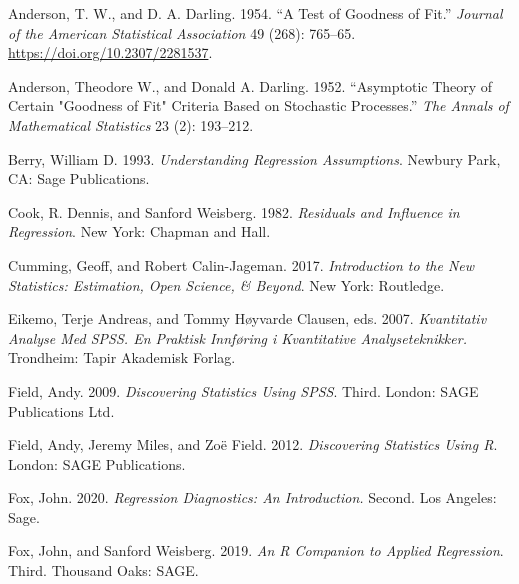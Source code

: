 \documentclass[
]{article}
\newlength{\cslhangindent}
\newlength{\cslentryspacingunit} %
\newenvironment{CSLReferences}[2] %
 {%
  \setlength{\parindent}{0pt}
  \ifodd #1
  \let\oldpar\par
  \def\par{\hangindent=\cslhangindent\oldpar}
  \fi
  \setlength{\parskip}{#2\cslentryspacingunit}
 }%
 {}
\begin{document}
\hypertarget{refs}{}
\begin{CSLReferences}{1}{0}
\leavevmode{}%
Anderson, T. W., and D. A. Darling. 1954. {``A {Test} of {Goodness} of
{Fit}.''} \emph{Journal of the American Statistical Association} 49
(268): 765--65. \url{https://doi.org/10.2307/2281537}.

\leavevmode{}%
Anderson, Theodore W., and Donald A. Darling. 1952. {``Asymptotic Theory
of Certain "Goodness of Fit" Criteria Based on Stochastic Processes.''}
\emph{The Annals of Mathematical Statistics} 23 (2): 193--212.

\leavevmode{}%
Berry, William D. 1993. \emph{Understanding Regression Assumptions}.
{Newbury Park, CA}: {Sage Publications}.

\leavevmode{}%
Cook, R. Dennis, and Sanford Weisberg. 1982. \emph{Residuals and
{Influence} in {Regression}}. {New York}: {Chapman and Hall}.

\leavevmode{}%
Cumming, Geoff, and Robert Calin-Jageman. 2017. \emph{Introduction to
the New Statistics: {Estimation}, Open Science, \& Beyond}. {New York}:
{Routledge}.

\leavevmode{}%
Eikemo, Terje Andreas, and Tommy Høyvarde Clausen, eds. 2007.
\emph{Kvantitativ Analyse Med {SPSS}. {En} Praktisk Innføring i
Kvantitative Analyseteknikker.} {Trondheim}: {Tapir Akademisk Forlag}.

\leavevmode{}%
Field, Andy. 2009. \emph{Discovering {Statistics Using SPSS}}. Third.
{London}: {SAGE Publications Ltd}.

\leavevmode{}%
Field, Andy, Jeremy Miles, and Zoë Field. 2012. \emph{Discovering
{Statistics Using R}}. {London}: {SAGE Publications}.

\leavevmode{}%
Fox, John. 2020. \emph{Regression {Diagnostics}: {An Introduction}.}
Second. {Los Angeles}: {Sage}.

\leavevmode{}%
Fox, John, and Sanford Weisberg. 2019. \emph{An {R Companion} to
{Applied Regression}}. Third. {Thousand Oaks}: {SAGE}.


\end{CSLReferences}
\end{document}
